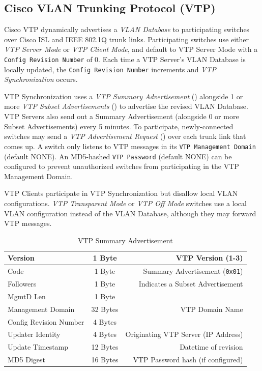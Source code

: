 \documentclass[12pt]{article}
\begin{document}
	\subsection[Cisco VTP]{Cisco VLAN Trunking Protocol (VTP) \label{subsec:CISCO VTP}}
	Cisco VTP dynamically advertises a \textit{VLAN Database} to participating switches over Cisco ISL and IEEE 802.1Q trunk links. Participating switches use either \textit{VTP Server Mode} or \textit{VTP Client Mode}, and default to VTP Server Mode with a \texttt{Config Revision Number} of 0. Each time a VTP Server's VLAN Database is locally updated, the \texttt{Config Revision Number} increments and \textit{VTP Synchronization} occurs.

	VTP Synchronization uses a \textit{VTP Summary Advertisement} () alongside 1 or more \textit{VTP Subset Advertisements} () to advertise the revised VLAN Database. VTP Servers also send out a Summary Advertisement (alongside 0 or more Subset Advertisements) every 5 minutes. To participate, newly-connected switches may send a \textit{VTP Advertisement Request} () over each trunk link that comes up. A switch only listens to VTP messages in its \texttt{VTP Management Domain} (default NONE). An MD5-hashed \texttt{VTP Password} (default NONE) can be configured to prevent unauthorized switches from participating in the VTP Management Domain.

	VTP Clients participate in VTP Synchronization but disallow local VLAN configurations. \textit{VTP Transparent Mode} or \textit{VTP Off Mode} switches use a local VLAN configuration instead of the VLAN Database, although they may forward VTP messages.

	\begin{table}[H]
	\centering
	\caption{VTP Summary Advertisement \label{tab:VTP SUMMARY}}
	\begin{tabular}{| l | c | r |}\hline
	Version				& 1 Byte	& VTP Version (1-3)\\\hline
	Code					& 1 Byte	& Summary Advertisement (\texttt{0x01})\\\hline
	Followers				& 1 Byte	& Indicates a Subset Advertisement\\\hline
	MgmtD Len				& 1 Byte	&\\\hline
	Management Domain		& 32 Bytes	& VTP Domain Name\\\hline
	Config Revision Number	& 4 Bytes	&\\\hline
	Updater Identity			& 4 Bytes	& Originating VTP Server (IP Address)\\\hline
	Update Timestamp		& 12 Bytes	& Datetime of revision\\\hline
	MD5 Digest				& 16 Bytes	& VTP Password hash (if configured)\\\hline
	\end{tabular}\end{table}
\end{document}

